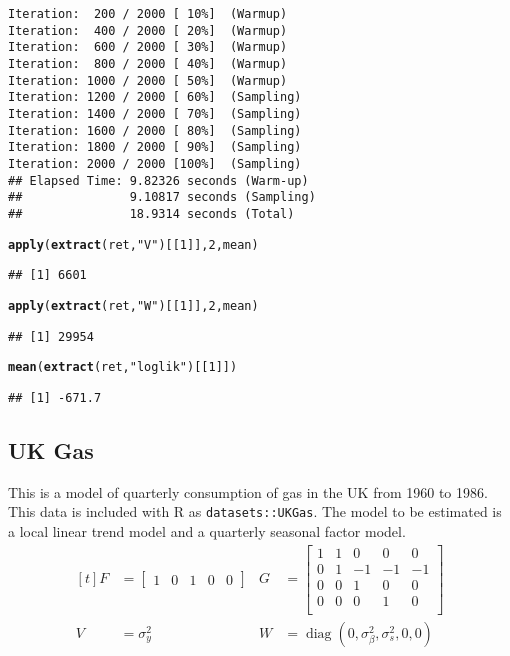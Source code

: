 \documentclass{article}\usepackage[]{graphicx}\usepackage[]{color}
\makeatletter
\newcommand{\hlnum}[1]{\textcolor[rgb]{0.686,0.059,0.569}{#1}}%
\newcommand{\hlstr}[1]{\textcolor[rgb]{0.192,0.494,0.8}{#1}}%
\newcommand{\hlstd}[1]{\textcolor[rgb]{0.345,0.345,0.345}{#1}}%
\newcommand{\hlkwd}[1]{\textcolor[rgb]{0.737,0.353,0.396}{\textbf{#1}}}%
\newenvironment{kframe}{%
 \def\at@end@of@kframe{}%
 \ifinner\ifhmode%
  \def\at@end@of@kframe{\end{minipage}}%
  \begin{minipage}{\columnwidth}%
 \fi\fi%
 \def\FrameCommand##1{\hskip\@totalleftmargin \hskip-\fboxsep
 \colorbox{shadecolor}{##1}\hskip-\fboxsep
     \hskip-\linewidth \hskip-\@totalleftmargin \hskip\columnwidth}%
 \MakeFramed {\advance\hsize-\width
   \@totalleftmargin\z@ \linewidth\hsize
   \@setminipage}}%
 {\par\unskip\endMakeFramed%
 \at@end@of@kframe}
\newenvironment{knitrout}{}{} %
\newcommand{\Rlang}{\textsf{R}}
\DeclareMathOperator{\diag}{diag}
\makeatother
\begin{document}
\begin{knitrout}
\begin{kframe}
\begin{verbatim}
Iteration:  200 / 2000 [ 10%]  (Warmup)
Iteration:  400 / 2000 [ 20%]  (Warmup)
Iteration:  600 / 2000 [ 30%]  (Warmup)
Iteration:  800 / 2000 [ 40%]  (Warmup)
Iteration: 1000 / 2000 [ 50%]  (Warmup)
Iteration: 1200 / 2000 [ 60%]  (Sampling)
Iteration: 1400 / 2000 [ 70%]  (Sampling)
Iteration: 1600 / 2000 [ 80%]  (Sampling)
Iteration: 1800 / 2000 [ 90%]  (Sampling)
Iteration: 2000 / 2000 [100%]  (Sampling)
## Elapsed Time: 9.82326 seconds (Warm-up)
##               9.10817 seconds (Sampling)
##               18.9314 seconds (Total)
\end{verbatim}
\begin{alltt}
\hlkwd{apply}\hlstd{(}\hlkwd{extract}\hlstd{(ret,} \hlstr{"V"}\hlstd{)[[}\hlnum{1}\hlstd{]],} \hlnum{2}\hlstd{, mean)}
\end{alltt}
\begin{verbatim}
## [1] 6601
\end{verbatim}
\begin{alltt}
\hlkwd{apply}\hlstd{(}\hlkwd{extract}\hlstd{(ret,} \hlstr{"W"}\hlstd{)[[}\hlnum{1}\hlstd{]],} \hlnum{2}\hlstd{, mean)}
\end{alltt}
\begin{verbatim}
## [1] 29954
\end{verbatim}
\begin{alltt}
\hlkwd{mean}\hlstd{(}\hlkwd{extract}\hlstd{(ret,} \hlstr{"loglik"}\hlstd{)[[}\hlnum{1}\hlstd{]])}
\end{alltt}
\begin{verbatim}
## [1] -671.7
\end{verbatim}
\end{kframe}
\end{knitrout}



\subsection{UK Gas}

This is a model of quarterly consumption of gas in the UK from 1960 to 1986.
This data is included with \Rlang{} as \texttt{datasets::UKGas}.
The model to be estimated is a local linear trend model and a quarterly seasonal factor model.
\begin{equation*}
  \begin{aligned}[t]
    F &=
    \begin{bmatrix}
      1 & 0 & 1 & 0 & 0 
    \end{bmatrix}
    & 
    G &=
    \begin{bmatrix}
      1 & 1 & 0 & 0 & 0  \\
      0 & 1 & -1 & -1 & -1 \\
      0 & 0 & 1 & 0 & 0 \\
      0 & 0 & 0 & 1 & 0 \\
    \end{bmatrix}
    \\
    V & = \sigma_{y}^{2} &
    W & = \diag (0, \sigma_{\beta}^{2}, \sigma_{s}^{2}, 0, 0) 
  \end{aligned}
\end{equation*}
\end{document}
